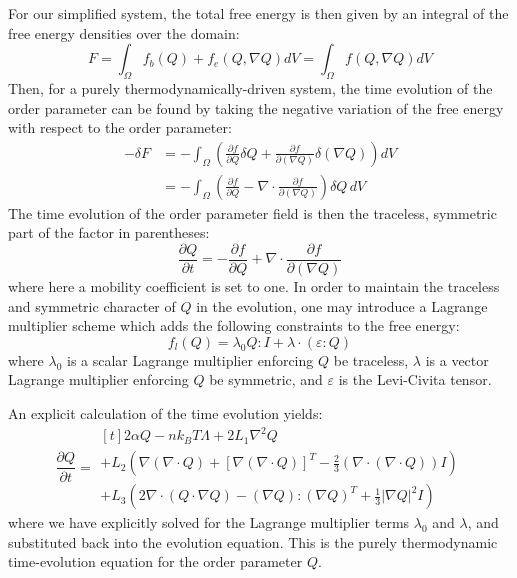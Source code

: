 \documentclass[reqno]{article}
\begin{document}
  For our simplified system, the total free energy is then given by an integral
  of the free energy densities over the domain:
  \begin{equation}
    F
    = \int_\Omega f_b(Q) + f_e(Q, \nabla Q) dV
    = \int_\Omega f(Q, \nabla Q) dV
  \end{equation}
  Then, for a purely thermodynamically-driven system, the time evolution
  of the order parameter can be found
  by taking the negative variation of the free energy with respect to the order
  parameter:
  \begin{equation}
    \begin{split}
    -\delta F
    &= -\int_\Omega \left( \frac{\partial f}{\partial Q} \delta Q
      + \frac{\partial f}{\partial (\nabla Q)} \delta (\nabla Q) \right) dV \\
    &= -\int_\Omega \left(
      \frac{\partial f}{\partial Q}
      - \nabla \cdot \frac{\partial f}{\partial (\nabla Q)}
    \right) \delta Q \, dV
    \end{split}
  \end{equation}
  The time evolution of the order parameter field is then the traceless,
  symmetric part of the factor in parentheses:
  \begin{equation}
    \frac{\partial Q}{\partial t}
    =
    -\frac{\partial f}{\partial Q}
    + \nabla \cdot \frac{\partial f}{\partial (\nabla Q)}
  \end{equation}
  where here a mobility coefficient is set to one.
  In order to maintain the traceless and symmetric character of $Q$ in the
  evolution, one may
  introduce a Lagrange multiplier scheme which adds the following constraints to
  the free energy:
  \begin{equation}
    f_l (Q) = \lambda_0 Q : I + \lambda \cdot \left( \varepsilon : Q \right)
  \end{equation}
  where $\lambda_0$ is a scalar Lagrange multiplier enforcing $Q$ be traceless,
  $\lambda$ is a vector Lagrange multiplier enforcing $Q$ be symmetric, and
  $\varepsilon$ is the Levi-Civita tensor.
  
  An explicit calculation of the time evolution yields:
  \begin{equation} \label{eq:Q-time-evolution}
    \frac{\partial Q}{\partial t}
    =
    \begin{multlined}[t]
      2 \alpha Q - n k_B T \Lambda + 2 L_1 \nabla^2 Q \\
      + L_2 \left(
        \nabla \left( \nabla \cdot Q \right)
        + \left[ \nabla \left( \nabla \cdot Q \right) \right]^T
        - \tfrac23 \left( \nabla \cdot \left( \nabla \cdot Q \right) \right) I
      \right) \\
      + L_3 \left(
        2 \nabla \cdot \left( Q \cdot \nabla Q \right)
        - \left( \nabla Q \right) : \left( \nabla Q \right)^T
        + \tfrac13 \left| \nabla Q \right|^2 I
      \right)
    \end{multlined}
  \end{equation}
  where we have explicitly solved for the Lagrange multiplier terms $\lambda_0$
  and $\lambda$, and
  substituted back into the evolution equation.
  This is the purely thermodynamic time-evolution equation for the order
  parameter $Q$.
  
\end{document}
